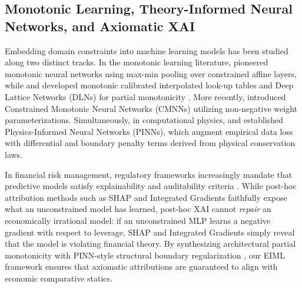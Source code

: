 \documentclass[pdflatex,sn-mathphys-num,twocolumn]{sn-jnl}
\theoremstyle{thmstyleone}
\theoremstyle{thmstyletwo}
\theoremstyle{thmstylethree}
\begin{document}
\subsection{Monotonic Learning, Theory-Informed Neural Networks, and Axiomatic XAI}
Embedding domain constraints into machine learning models has been studied along two distinct tracks. In the monotonic learning literature, \citet{sill1997monotonic} pioneered monotonic neural networks using max-min pooling over constrained affine layers, while \citet{gupta2016monotonic} and \citet{you2017deep} developed monotonic calibrated interpolated look-up tables and Deep Lattice Networks (DLNs) for partial monotonicity \citep{cano2019monotonic}. More recently, \citet{runje2023constrained} introduced Constrained Monotonic Neural Networks (CMNNs) utilizing non-negative weight parameterizations. Simultaneously, in computational physics, \citet{raissi2019physics} and \citet{karniadakis2021physics} established Physics-Informed Neural Networks (PINNs), which augment empirical data loss with differential and boundary penalty terms derived from physical conservation laws.

In financial risk management, regulatory frameworks increasingly mandate that predictive models satisfy explainability and auditability criteria \citep{bussmann2021explainable,bucker2022transparency}. While post-hoc attribution methods such as SHAP \citep{lundberg2017unified} and Integrated Gradients \citep{sundararajan2017axiomatic} faithfully expose what an unconstrained model has learned, post-hoc XAI cannot \textit{repair} an economically irrational model: if an unconstrained MLP learns a negative gradient with respect to leverage, SHAP and Integrated Gradients simply reveal that the model is violating financial theory. By synthesizing architectural partial monotonicity \citep{sill1997monotonic,runje2023constrained} with PINN-style structural boundary regularization \citep{raissi2019physics}, our EIML framework ensures that axiomatic attributions are guaranteed to align with economic comparative statics.
\end{document}
